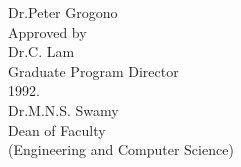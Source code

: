 \begin{titlepage}
    \hspace*{77pt}Dr.\@ Peter Grogono\\[2.5ex]
    Approved by \hspace{9pt}\underline{\hspace{232pt}}\\
    \hspace*{79pt}Dr.\@ C. Lam\\
    \hspace*{79pt}Graduate Program Director\\[6ex]
    \underline{\hspace*{110pt}} 1992. \hspace{64pt} \underline{\hspace{219pt}}\\
    \hspace*{213pt}Dr.\@ M.N.S. Swamy\\
    \hspace*{213pt}Dean of Faculty\\    
    \hspace*{213pt}(Engineering and Computer Science)

  \end{titlepage}

